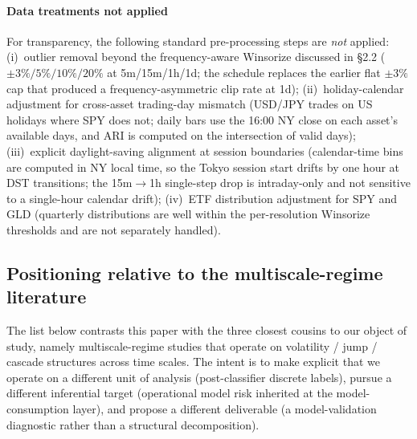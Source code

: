 \documentclass[preprint,12pt,authoryear]{elsarticle}
\begin{document}
\paragraph{Data treatments not applied}
For transparency, the following standard pre-processing steps are \emph{not} applied:
(i)~outlier removal beyond the frequency-aware Winsorize discussed in \S{}2.2 ($\pm 3\%/5\%/10\%/20\%$ at 5m/15m/1h/1d; the schedule replaces the earlier flat $\pm 3\%$ cap that produced a frequency-asymmetric clip rate at 1d);
(ii)~holiday-calendar adjustment for cross-asset trading-day mismatch (USD/JPY trades on US holidays where SPY does not; daily bars use the 16:00 NY close on each asset's available days, and ARI is computed on the intersection of valid days);
(iii)~explicit daylight-saving alignment at session boundaries (calendar-time bins are computed in NY local time, so the Tokyo session start drifts by one hour at DST transitions; the 15m$\to$1h single-step drop is intraday-only and not sensitive to a single-hour calendar drift);
(iv)~ETF distribution adjustment for SPY and GLD (quarterly distributions are well within the per-resolution Winsorize thresholds and are not separately handled).

\subsection{Positioning relative to the multiscale-regime literature}\label{app:lit_comparison}
The list below contrasts this paper with the three closest cousins to our object of study, namely multiscale-regime studies that operate on volatility / jump / cascade structures across time scales. The intent is to make explicit that we operate on a different unit of analysis (post-classifier discrete labels), pursue a different inferential target (operational model risk inherited at the model-consumption layer), and propose a different deliverable (a model-validation diagnostic rather than a structural decomposition).
\end{document}

